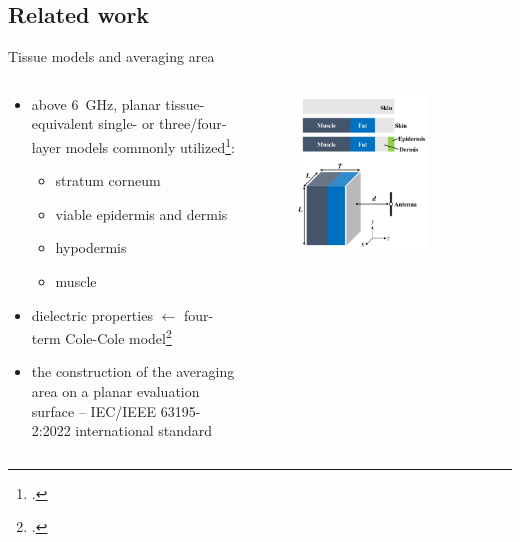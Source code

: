 \documentclass[xcolor=dvipsnames,10pt]{beamer}
\begin{document}
\subsection[Related work]{Related work}
\begin{frame}{Tissue models and averaging area}
    \begin{columns}[c]
        \begin{column}{0.5\textwidth}
            \begin{itemize}
                \item above \SI{6}{\GHz}, planar tissue-equivalent single- or three/four-layer models commonly utilized\footcite{Zhadobov2011Millimeter}:
                    \begin{itemize}
                        \item stratum corneum
                        \item viable epidermis and dermis
                        \item hypodermis
                        \item muscle
                    \end{itemize}
                \item dielectric properties $\leftarrow$ four-term Cole-Cole model\footcite{Gabriel1996Compilation}
                \item the construction of the averaging area on a planar evaluation surface -- IEC/IEEE 63195-2:2022 international standard
            \end{itemize}
        \end{column}
        \begin{column}{0.5\textwidth}
            \begin{center}
            \begin{figure}
                \includegraphics[width=0.75\textwidth]{figures/Li2021Figure2_adjusted.pdf}

\end{figure}
\end{center}
\end{column}
\end{columns}
\end{frame}
\end{document}
